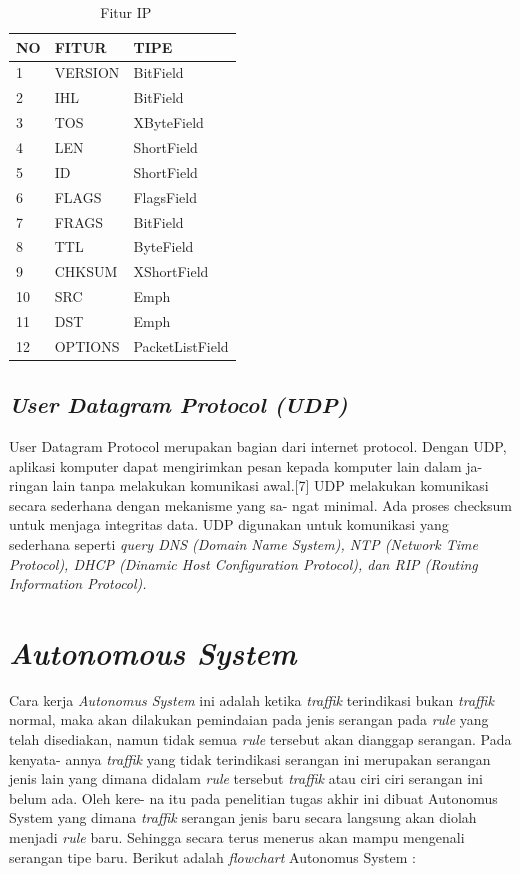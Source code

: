  	\begin{table}[H]
 		\centering
 		\caption{\ Fitur IP}
 		\label{Fitur IP}
 		\begin{tabular}{|l|l|l|}
 			\hline
 			NO & FITUR     & TIPE \\ \hline
 			1  & VERSION    & BitField      \\ \hline
 			2  & IHL & BitField      \\ \hline
 			3  & TOS        & XByteField      \\ \hline
 			4  & LEN      & ShortField      \\ \hline
 			5  & ID    & ShortField      \\ \hline
 			6  & FLAGS & FlagsField      \\ \hline
 			7  & FRAGS        & BitField      \\ \hline
 			8  & TTL      & ByteField     \\ \hline
 			9  & CHKSUM    & XShortField      \\ \hline
 			10  & SRC &  Emph      \\ \hline
 			11  & DST        & Emph      \\ \hline
 			12 & OPTIONS & PacketListField \\ \hline
 		\end{tabular}
 	\end{table}
 	
 	\subsection{\emph{User Datagram Protocol (UDP)}}
 	User Datagram Protocol merupakan bagian dari internet protocol. Dengan
 	UDP, aplikasi komputer dapat mengirimkan pesan kepada komputer lain dalam ja-
 	ringan lain tanpa melakukan komunikasi awal.[7]
 	UDP melakukan komunikasi secara sederhana dengan mekanisme yang sa-
 	ngat minimal. Ada proses checksum untuk menjaga integritas data. UDP digunakan
 	untuk komunikasi yang sederhana seperti \emph{query DNS (Domain Name System), NTP
 	 	(Network Time Protocol), DHCP (Dinamic Host Configuration Protocol), dan RIP
 	 	(Routing Information Protocol).}
 	

 
 

 \section{\emph{Autonomous System}}
 Cara kerja \emph{Autonomus System} ini adalah ketika \emph{traffik} terindikasi bukan \emph{traffik}
 normal, maka akan dilakukan pemindaian pada jenis serangan pada \emph{rule} yang telah
 disediakan, namun tidak semua \emph{rule} tersebut akan dianggap serangan. Pada kenyata-
 annya \emph{traffik} yang tidak terindikasi serangan ini merupakan serangan jenis lain yang
 dimana didalam \emph{rule} tersebut \emph{traffik} atau ciri ciri serangan ini belum ada. Oleh kere-
 na itu pada penelitian tugas akhir ini dibuat Autonomus System yang dimana \emph{traffik}
 serangan jenis baru secara langsung akan diolah menjadi \emph{rule} baru. Sehingga secara
 terus menerus akan mampu mengenali serangan tipe baru.
 Berikut adalah \emph{flowchart} Autonomus System :
 
